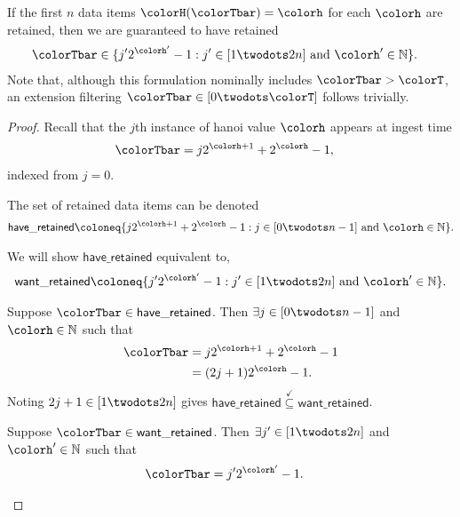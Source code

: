 \begin{lemma}
\label{thm:retained-equivalence-stretched}
If the first $n$ data items $\colorH(\colorTbar) = \colorh$ for each \hv{} $\colorh$ are retained, then we are guaranteed to have retained
\begin{align*}
\colorTbar
&\in
\{
  j'2^{\colorh'} - 1
  :
  j' \in [1 \twodots 2n]
  \text{ and }
  \colorh' \in \mathbb{N}
\}.
\end{align*}
Note that, although this formulation nominally includes $\colorTbar > \colorT$, an extension filtering $\colorTbar \in [0 \twodots \colorT]$ follows trivially.
\end{lemma}
\begin{proof}

Recall that the $j$th instance of hanoi value $\colorh$ appears at ingest time
\begin{align*}
\colorTbar
&= j2^{\colorh + 1} + 2^{\colorh} - 1,
\end{align*}
indexed from $j=0$.

The set of retained data items can be denoted
\begin{align*}
\mathsf{have\_retained} \coloneq
\{
  j2^{\colorh + 1} + 2^{\colorh} - 1
  :
  j \in [0 \twodots n-1]
  \text{ and }
  \colorh \in \mathbb{N}
\}.
\end{align*}

We will show $\mathsf{have\_retained}$ equivalent to,
\begin{align*}
\mathsf{want\_retained} \coloneq
\{
  j'2^{\colorh'} - 1
  :
  j' \in [1 \twodots 2n]
  \text{ and }
  \colorh' \in \mathbb{N}
\}.
\end{align*}

\begin{proofpart}
Suppose $\colorTbar \in \mathsf{have\_retained}$.
Then $\exists j \in [0 \twodots n-1]$ and $\colorh \in \mathbb{N}$ such that
\begin{align*}
\colorTbar
&= j2^{\colorh + 1} + 2^{\colorh} - 1\\
&= (2j + 1)2^{\colorh} - 1.
\end{align*}
Noting $2j + 1 \in [1 \twodots 2n]$ gives $\mathsf{have\_retained} \stackrel{\checkmark}{\subseteq} \mathsf{want\_retained}$.
\end{proofpart}

\begin{proofpart}
Suppose $\colorTbar \in \mathsf{want\_retained}$.
Then $\exists j'\in [1 \twodots 2n]$ and $\colorh' \in \mathbb{N}$ such that
\begin{align*}
\colorTbar
&= j'2^{\colorh'} - 1.
\end{align*}


\end{proofpart}
\end{proof}

